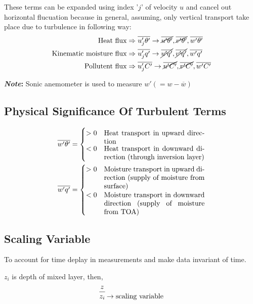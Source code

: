 \documentclass[fleqn,10pt]{SelfArx} %
\newcommand*{\bfrac}[2]{\genfrac{}{}{0pt}{}{#1}{#2}}
\begin{document}
These terms can be expanded using index '\( j \)' of velocity \( u \) and cancel out horizontal flucuation because in general, assuming, only vertical transport take place due to turbulence in following way:
\begin{align*}
	\text{Heat flux} &\Rightarrow \overline{u_j'\theta'} \rightarrow \cancel{\overline{u'\theta'}}, \cancel{\overline{v'\theta'}}, \overline{w'\theta'} \\
	\text{Kinematic moisture flux} &\Rightarrow \overline{u_j'q'} \rightarrow \cancel{\overline{u'q'}}, \cancel{\overline{v'q'}}, \overline{w'q'} \\
	\text{Pollutent flux} &\Rightarrow \overline{u_j'C'} \rightarrow \cancel{\overline{u'C'}}, \cancel{\overline{v'C'}}, \overline{w'C'}
\end{align*}

\textbf{\textit{Note}:} Sonic anemometer is used to measure \(w' \left(=w-\overline{w}\right) \)

\subsection{Physical Significance Of Turbulent Terms}
\begin{align*}
	\overline{w'\theta'} &=
	\begin{cases}
		>0 & \parbox[t]{5cm}{Heat transport in upward direction} \\
		<0 & \parbox[t]{5cm}{Heat transport in downward direction (through inversion layer)}
	\end{cases} \\
	\overline{w'q'} &=
	\begin{cases}
		>0 & \parbox[t]{5cm}{Moisture transport in upward direction (supply of moisture from surface)} \\
		<0 & \parbox[t]{5cm}{Moisture transport in downward direction (supply of moisture from TOA)}
	\end{cases}
\end{align*}

\subsection{Scaling Variable}
To account for time deplay in measurements and make data invariant of time.

\( z_i \) is depth of mixed layer, then,
\begin{align*}
	\frac{z}{z_i} \bfrac{}{\rightarrow \text{scaling variable}}
\end{align*}
\end{document}

